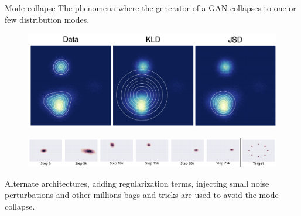\begin{frame}{Mode collapse}
	The phenomena where the generator of a GAN collapses to one or few distribution modes.
	\vspace{-0.15cm}
	\begin{figure}
		\centering
		\includegraphics[width=0.75\linewidth]{figs/mode_collapse_1}
	\end{figure}
	\vspace{-0.2cm}
	\begin{figure}
		\centering
		\includegraphics[width=1.0\linewidth]{figs/mode_collapse_3}
	\end{figure}
	Alternate architectures, adding regularization terms, injecting small noise
	perturbations and other millions bags and tricks are used to avoid the mode collapse.
	
\end{frame}

